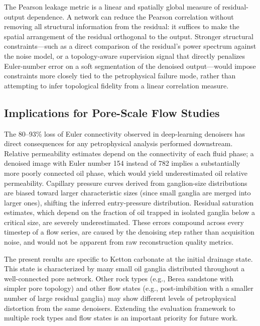 \documentclass[review,12pt]{elsarticle}
\begin{document}
The Pearson leakage metric is a linear and spatially global measure of
residual-output dependence.  A network can reduce the Pearson correlation
without removing all structural information from the residual: it
suffices to make the spatial arrangement of the residual orthogonal to
the output.  Stronger structural constraints---such as a direct
comparison of the residual's power spectrum against the noise model, or
a topology-aware supervision signal that directly penalizes Euler-number
error on a soft segmentation of the denoised output---would impose
constraints more closely tied to the petrophysical failure mode, rather
than attempting to infer topological fidelity from a linear correlation
measure.

\subsection{Implications for Pore-Scale Flow Studies}
\label{sec:discussion:implications}

The 80--93\% loss of Euler connectivity observed in deep-learning
denoisers has direct consequences for any petrophysical analysis
performed downstream.  Relative permeability estimates depend on the
connectivity of each fluid phase; a denoised image with Euler number 154
instead of 782 implies a substantially more poorly connected oil phase,
which would yield underestimated oil relative permeability.  Capillary
pressure curves derived from ganglion-size distributions are biased
toward larger characteristic sizes (since small ganglia are merged into
larger ones), shifting the inferred entry-pressure distribution.
Residual saturation estimates, which depend on the fraction of oil
trapped in isolated ganglia below a critical size, are severely
underestimated.  These errors compound across every timestep of a flow
series, are caused by the denoising step rather than acquisition noise,
and would not be apparent from raw reconstruction quality metrics.

The present results are specific to Ketton carbonate at the initial
drainage state.  This state is characterized by many small oil ganglia
distributed throughout a well-connected pore network.  Other rock types
(e.g., Berea sandstone with simpler pore topology) and other flow states
(e.g., post-imbibition with a smaller number of large residual ganglia)
may show different levels of petrophysical distortion from the same
denoisers.  Extending the evaluation framework to multiple rock types and
flow states is an important priority for future work.
\end{document}
